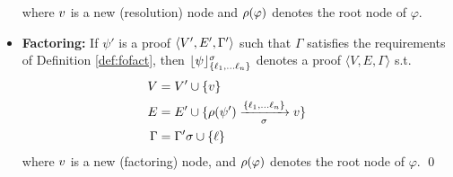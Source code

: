 \begin{definition}
\begin{itemize}
    where $v$ is a new (resolution) node and $\rho(\varphi)$ denotes the root node of $\varphi$. 
  \item \textbf{Factoring:}
  If $\psi'$ is a proof $\langle V', E', \Gamma' \rangle$ such that $\Gamma$ satisfies the requirements of Definition \ref{def:fofact}, then $\lfloor \psi \rfloor_{\{\ell_1, \ldots \ell_n\}}^{\sigma}$ denotes a proof $\langle V, E, \Gamma \rangle$ s.t.
    \begin{align*}
         \hspace{-0.6cm} V &= V' \cup \{\n \} \\
         \hspace{-0.6cm} E &= E' \cup \{ \raiz{\psi'} \xrightarrow[\sigma]{\{\ell_1, \ldots \ell_n\}} \n \} \\
       \hspace{-0.6cm} \Gamma &= \clause' \sigma \cup \{ \ell \}
    \end{align*}
    where $v$ is a new (factoring) node, and $\rho(\varphi)$ denotes the root node of $\varphi$.
  \qed
\end{itemize}
\end{definition}


